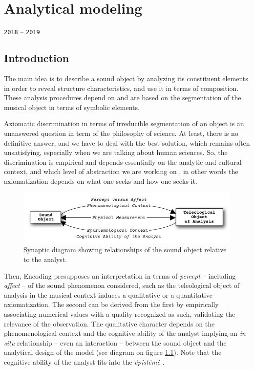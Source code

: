 \chapter{Analytical modeling}
\thispagestyle{empty}

{\texttt{2018} -- \texttt{2019}}
\bigskip
\smallskip
\label{am}

\section{Introduction}

The main idea is to describe a sound object by analyzing its constituent elements in order to reveal structure characteristics, and use it in terms of composition.
These analysis procedures depend on and are based on the segmentation of the musical object in terms of symbolic elements.

\smallskip

Axiomatic discrimination in terms of irreducible segmentation of an object is an unanswered question in term of the philosophy of science. At least, there is no definitive answer, and we have to deal with the best solution, which remains often unsatisfying, especially when we are talking about human sciences. So, the discrimination is empirical and depends essentially on the analytic and cultural context, and which level of abstraction we are working on \citep{sn}, in other words the axiomatization depends on what one seeks and how one seeks it.

\begin{figure}[!hbt]
	\begin{center}
		\includegraphics[width=\columnwidth]{img/7583}
		\caption{Synaptic diagram showing relationships of the sound object relative to the analyst.}
		\label{fig:sdqq}
	\end{center}
\end{figure}

Then, Encoding presupposes an interpretation in terms of \textit{percept} -- including \textit{affect} -- of the sound phenomenon considered, such as the teleological object of analysis in the musical context induces a qualitative or a quantitative axiomatization. The second can be derived from the first by empirically associating numerical values with a quality recognized as such, validating the relevance of the observation. The qualitative character depends on the phenomenological context and the cognitive ability of the analyst implying an \textit{in situ} relationship -- even an interaction -- between the sound object and the analytical design of the model (see diagram on figure \ref{fig:sdqq}). Note that the cognitive ability of the analyst fits into the \textit{\'epist\'em\`e} \citep{mflmelc}.
	
